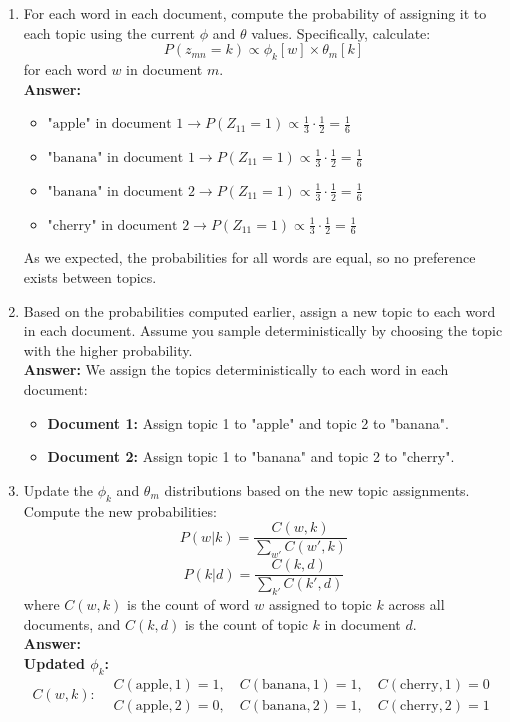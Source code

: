 \documentclass{article}
\begin{document}
\begin{enumerate}
 \item For each word in each document, compute the probability of assigning it to each topic using the current $\phi$ and $\theta$ values. Specifically, calculate:
\[
P(z_{mn} = k) \propto \phi_k[w] \times \theta_m[k]
\]
for each word $w$ in document $m$.\\
\textbf{Answer:}
	\begin{itemize}
	\item $ \text{"apple" in document 1} \rightarrow P(Z_{11} = 1) \propto \frac{1}{3} \cdot \frac{1}{2} = \frac{1}{6}$
	\item $ \text{"banana" in document 1} \rightarrow P(Z_{11} = 1) \propto \frac{1}{3} \cdot \frac{1}{2} = \frac{1}{6}$
	\item $ \text{"banana" in document 2} \rightarrow P(Z_{11} = 1) \propto \frac{1}{3} \cdot \frac{1}{2} = \frac{1}{6}$
	\item $ \text{"cherry" in document 2} \rightarrow P(Z_{11} = 1) \propto \frac{1}{3} \cdot \frac{1}{2} = \frac{1}{6}$
	\end{itemize}
	\text As we expected, the probabilities for all words are equal, so no preference exists between topics.

 \item Based on the probabilities computed earlier, assign a new topic to each word in each document. Assume you sample deterministically by choosing the topic with the higher probability.\\
\textbf{Answer:}
	We assign the topics deterministically to each word in each document:
	\begin{itemize}
	    \item \textbf{Document 1:} Assign topic 1 to "apple" and topic 2 to "banana".
	    \item \textbf{Document 2:} Assign topic 1 to "banana" and topic 2 to "cherry".
	\end{itemize}


  \item Update the $\phi_k$ and $\theta_m$ distributions based on the new topic assignments. Compute the new probabilities:
\[
P(w|k) = \frac{C(w, k)}{\sum_{w'} C(w', k)}
\]
\[
P(k|d) = \frac{C(k, d)}{\sum_{k'} C(k', d)}
\]
where $C(w, k)$ is the count of word $w$ assigned to topic $k$ across all documents, and $C(k, d)$ is the count of topic $k$ in document $d$.\\

\textbf{Answer:}\\
	\textbf{Updated \( \phi_k \):}
	\[
	C(w, k):
	\begin{aligned}
	    &C(\text{apple}, 1) = 1, \quad C(\text{banana}, 1) = 1, \quad C(\text{cherry}, 1) = 0 \\
	    &C(\text{apple}, 2) = 0, \quad C(\text{banana}, 2) = 1, \quad C(\text{cherry}, 2) = 1
	\end{aligned}
	\]
	

\end{enumerate}
\end{document}
